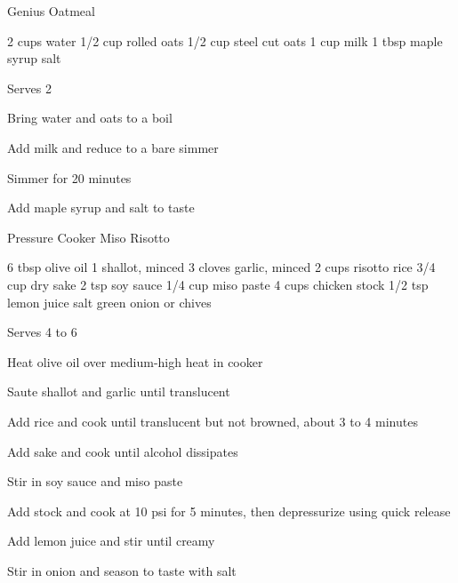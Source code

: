     
\begin{recipe}{Genius Oatmeal}{}
\begin{ingredients}
2 cups water
1/2 cup rolled oats
1/2 cup steel cut oats
1 cup milk
1 tbsp maple syrup
salt
\end{ingredients}
\nextcolumn
Serves 2
\begin{steps}
    \item Bring water and oats to a boil
    \item Add milk and reduce to a bare simmer
    \item Simmer for 20 minutes
    \item Add maple syrup and salt to taste
\end{steps}
\end{recipe}

\begin{denserecipe}{Pressure Cooker Miso Risotto}{}
\begin{ingredients}
6 tbsp olive oil
1 shallot, minced
3 cloves garlic, minced
2 cups risotto rice
3/4 cup dry sake
2 tsp soy sauce
1/4 cup miso paste
4 cups chicken stock
1/2 tsp lemon juice
salt
green onion or chives
\end{ingredients}
\nextcolumn
Serves 4 to 6
\begin{steps}
    \item Heat olive oil over medium-high heat in cooker
    \item Saute shallot and garlic until translucent
    \item Add rice and cook until translucent but not browned, about 3 to 4 minutes
    \item Add sake and cook until alcohol dissipates
    \item Stir in soy sauce and miso paste
    \item Add stock and cook at 10 psi for 5 minutes, then depressurize using quick release
    \item Add lemon juice and stir until creamy
    \item Stir in onion and season to taste with salt
\end{steps}
\end{denserecipe}

